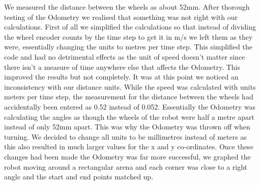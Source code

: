 \documentclass[]{article}
\begin{document}
We measured the distance between the wheels as about 52mm. After thorough testing of the Odometry we realised that something was not right with our calculations. First of all we simplified the calculations so that instead of dividing the wheel encoder counts by the time step to get it in m/s we left them as they were, essentially changing the units to metres per time step. This simplified the code and had no detrimental effects as the unit of speed doesn’t matter since there isn’t a measure of time anywhere else that affects the Odometry. This improved the results but not completely. It was at this point we noticed an inconsistency with our distance units. While the speed was calculated with units meters per time step, the measurement for the distance between the wheels had accidentally been entered as 0.52 instead of 0.052. Essentially the Odometry was calculating the angles as though the wheels of the robot were half a metre apart instead of only 52mm apart. This was why the Odometry was thrown off when turning. We decided to change all units to be millimetres instead of meters as this also resulted in much larger values for the x and y co-ordinates. Once these changes had been made the Odometry was far more successful, we graphed the robot moving around a rectangular arena and each corner was close to a right angle and the start and end points matched up.
  
\end{document}
